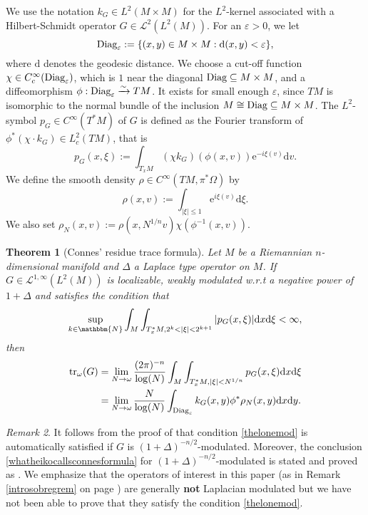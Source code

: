 \documentclass[10pt]{amsart}
\newtheorem{thm}{Theorem}[section]
\theoremstyle{remark}
\newtheorem{remark}[thm]{Remark}
\theoremstyle{definition}
\begin{document}
We use the notation $k_G\in L^2(M\times M)$ for the $L^2$-kernel associated with a Hilbert-Schmidt operator $G\in \mathcal{L}^2(L^2(M))$. For an ${\varepsilon}>0$, we let 
$$\textnormal{Diag}_{\varepsilon}:=\{(x,y)\in M\times M: \mathrm{d}(x,y)<{\varepsilon}\},$$ 
where $\mathrm{d}$ denotes the geodesic distance. We choose a cut-off function $\chi\in C^\infty_c(\textnormal{Diag}_{\varepsilon})$, which is $1$ near the diagonal $\textnormal{Diag}\subseteq M\times M$, and a diffeomorphism $\phi: \textnormal{Diag}_{\varepsilon} \xrightarrow{\sim} TM$. It exists for small enough ${\varepsilon}$, since $TM$ is isomorphic to the normal bundle of the inclusion $M\cong \textnormal{Diag}\subseteq M\times M$. The $L^2$-symbol $p_G\in C^\infty(T^*M)$ of $G$ is defined as the Fourier transform of $\phi^*(\chi\cdot k_G)\in L^2_c(TM)$, that is
$$p_G(x,\xi):=\int_{T_xM} (\chi k_G)(\phi(x,v)){\mathrm{e}}^{-i\xi(v)}{\mathrm{d}} v.$$
We define the smooth density $\rho\in C^\infty(TM,\pi^*\Omega)$ by 
\begin{equation}
\label{definrho}
\rho(x,v):=\int_{|\xi|\leq 1} {\mathrm{e}}^{i\xi(v)}{\mathrm{d}} \xi.
\end{equation}
We also set $\rho_N(x,v):=\rho(x,N^{1/n}v)\chi(\phi^{-1}(x,v))$.

\begin{thm}[Connes' residue trace formula]
\label{connesformulabitches}
Let $M$ be a Riemannian $n$-dimensional manifold and $\Delta$ a Laplace type operator on $M$. If $G\in \mathcal{L}^{1,\infty}(L^2(M))$ is localizable, weakly modulated w.r.t a negative power of $1+\Delta$ and satisfies the condition that 
\begin{equation}
\label{thelonemod}
\sup_{k\in {\mathbbm{N}}}\int_M\int_{T^*_xM, 2^k<|\xi|<2^{k+1}} |p_G(x,\xi)|{\mathrm{d}} x{\mathrm{d}} \xi<\infty,
\end{equation}
then
\begin{align}
\label{whatheikocallsconnesformula}
{\mathrm{t}\mathrm{r}}_\omega(G)&=\lim_{N\to \omega}\frac{(2\pi)^{-n}}{\log(N)} \int_M\int_{T^*_xM, |\xi|<N^{1/n}} p_G(x,\xi){\mathrm{d}} x{\mathrm{d}} \xi\\
\label{kernelsconnesformula}
&=\lim_{N\to \omega}\frac{N}{\log(N)}\int_{\textnormal{Diag}_{\varepsilon}} k_G(x,y)\phi^*\rho_N(x,y){\mathrm{d}} x{\mathrm{d}} y.
\end{align}
\end{thm}

\begin{remark}
It follows from the proof of \cite[Proposition 11.3.18]{sukolord} that condition \eqref{thelonemod} is automatically satisfied if $G$ is $(1+\Delta)^{-n/2}$-modulated. Moreover, the conclusion \eqref{whatheikocallsconnesformula} for $(1+\Delta)^{-n/2}$-modulated is stated and proved as \cite[Theorem 11.6.14]{sukolord}. We emphasize that the operators of interest in this paper (as in Remark \ref{introsobregrem} on page \pageref{introsobregrem}) are generally {\bf not} Laplacian modulated but we have not been able to prove that they satisfy the condition \eqref{thelonemod}.
\end{remark}
\end{document}
